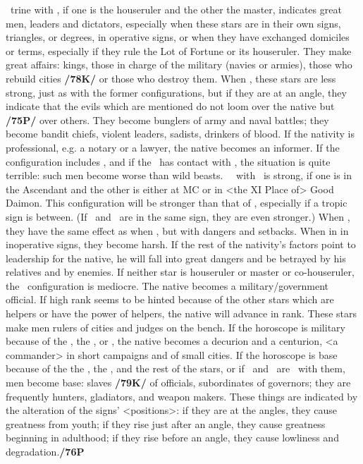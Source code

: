 \Jupiter\, \marginnote{\Jupiter \Trine \Mars} trine with \Mars, if one is the houseruler and the other the master, indicates great men, leaders and dictators, especially when these stars are in their own signs, triangles, or degrees, in operative signs, or when they have exchanged domiciles or terms, especially if they rule the Lot of Fortune or its houseruler. They make great affairs: kings, those in charge of the military (navies or armies), those who rebuild cities
\textbf{/78K/} or those who destroy them. When \Sextile, these stars are less strong, just as with the former configurations, but if they are at an \mndl angle, they indicate that the evils which are mentioned do not loom over the native but \textbf{/75P/} over others. They become bunglers of army and naval battles; they become bandit chiefs, violent leaders, sadists, drinkers of blood. If the nativity is professional, e.g. a notary or a lawyer, the native becomes an informer. If the configuration includes \Mercury, and if the \Moon\, has contact with \Mars, the situation is quite terrible: such men become worse than wild beasts. \Jupiter\, \Square\, with \Mars\, is strong, if one is in the Ascendant and the other is either at MC or in <the
XI Place of> Good Daimon. This configuration will be stronger than that of \Trine, especially if a tropic
sign is between. (If \Jupiter\, and \Mars\, are in the same sign, they are even stronger.) When \Square, they
have the same effect as when \Trine, but with dangers and setbacks. When in \Opposition in inoperative signs, they become harsh. If the rest of the nativity’s factors point to leadership for the native, he will fall into great dangers and be betrayed by his relatives and by enemies. \mndl If neither star is houseruler or master or co-houseruler, the \Trine\, configuration is mediocre. The native becomes a military/government official. If high rank seems to be hinted because of the other stars which are helpers or have the power of helpers, the native will advance in rank. These stars make men rulers of cities and judges on the bench. If the horoscope is military because of the \Sun, the \Moon, or \Saturn, the native becomes a decurion and a centurion, <a commander> in short campaigns and of small cities. If the horoscope is base because of the the \Sun, the \Moon, and the rest of the stars, or if \Mars\, and \Jupiter\, are \Trine\, with them, men become base: slaves \textbf{/79K/} of officials, subordinates of governors; they are frequently hunters, gladiators, and weapon makers. \mndl These things are indicated by the alteration of the signs’ <positions>: if they are at the angles, they cause greatness from youth; if they rise just after an angle, they cause greatness beginning in adulthood; if they rise before an angle, they cause lowliness and degradation.\textbf{/76P}

\newpage